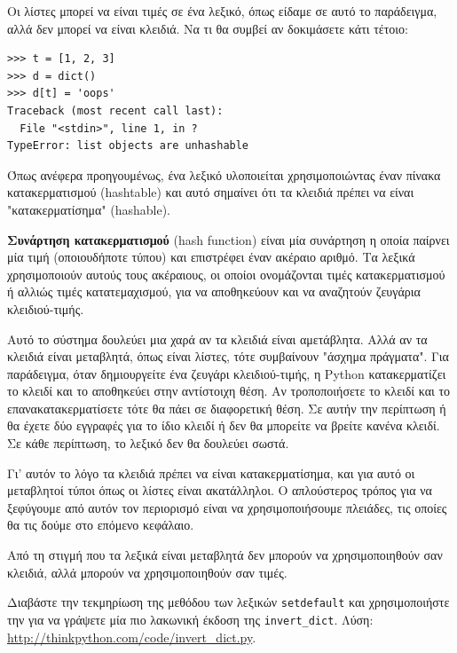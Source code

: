 \documentclass[10pt]{book}
\begin{document}
Οι λίστες μπορεί να είναι τιμές σε ένα λεξικό, όπως είδαμε σε αυτό το παράδειγμα, αλλά δεν μπορεί να είναι κλειδιά. Να τι θα συμβεί αν δοκιμάσετε κάτι τέτοιο:


\begin{verbatim}
>>> t = [1, 2, 3]
>>> d = dict()
>>> d[t] = 'oops'
Traceback (most recent call last):
  File "<stdin>", line 1, in ?
TypeError: list objects are unhashable
\end{verbatim}
%
Όπως ανέφερα προηγουμένως, ένα λεξικό υλοποιείται χρησιμοποιώντας έναν πίνακα κατακερματισμού (hashtable) και αυτό σημαίνει ότι τα κλειδιά πρέπει να είναι "κατακερματίσημα" (hashable).

{\bf Συνάρτηση κατακερματισμού} (hash function) είναι μία συνάρτηση η οποία παίρνει μία τιμή (οποιουδήποτε τύπου) και επιστρέφει έναν ακέραιο αριθμό. Τα λεξικά χρησιμοποιούν αυτούς τους ακέραιους, οι οποίοι ονομάζονται τιμές κατακερματισμού ή αλλιώς τιμές κατατεμαχισμού, για να αποθηκεύουν και να αναζητούν ζευγάρια κλειδιού-τιμής.

Αυτό το σύστημα δουλεύει μια χαρά αν τα κλειδιά είναι αμετάβλητα. Αλλά αν τα κλειδιά είναι μεταβλητά, όπως είναι λίστες, τότε συμβαίνουν "άσχημα πράγματα".  Για παράδειγμα, όταν δημιουργείτε ένα ζευγάρι κλειδιού-τιμής, η  Python  κατακερματίζει το κλειδί και το αποθηκεύει στην αντίστοιχη θέση. Αν τροποποιήσετε το κλειδί και το επανακατακερματίσετε τότε θα πάει σε διαφορετική θέση. Σε αυτήν την περίπτωση ή θα έχετε δύο εγγραφές για το ίδιο κλειδί ή δεν θα μπορείτε να βρείτε κανένα κλειδί. Σε κάθε περίπτωση, το λεξικό δεν θα δουλεύει σωστά.

Γι' αυτόν το λόγο τα κλειδιά πρέπει να είναι κατακερματίσημα, και για αυτό οι μεταβλητοί τύποι όπως οι λίστες είναι ακατάλληλοι. Ο απλούστερος τρόπος για να ξεφύγουμε από αυτόν τον περιορισμό είναι να χρησιμοποιήσουμε πλειάδες, τις οποίες θα τις δούμε στο επόμενο κεφάλαιο.

Από τη στιγμή που τα λεξικά είναι μεταβλητά δεν μπορούν να χρησιμοποιηθούν σαν κλειδιά, αλλά μπορούν να χρησιμοποιηθούν σαν τιμές.
\\
\begin{exercise}

Διαβάστε την τεκμηρίωση της μεθόδου των λεξικών {\tt setdefault} και χρησιμοποιήστε την για να γράψετε μία πιο λακωνική έκδοση της  \verb"invert_dict". Λύση: \url{http://thinkpython.com/code/invert_dict.py}.
\end{exercise}
\end{document}
